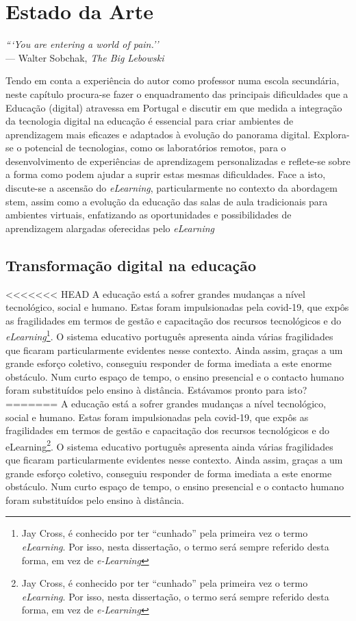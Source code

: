 \chapter{Estado da Arte}
\label{Capitulo2}

\begin{flushright}
\textit{```You are entering a world of pain.''} \\[0.5em]
--- Walter Sobchak, \textit{The Big Lebowski}
\end{flushright}
Tendo em conta a experiência do autor como professor numa escola secundária, neste capítulo procura-se fazer o enquadramento das principais dificuldades que a Educação (digital) atravessa em Portugal e discutir em que medida a integração da tecnologia digital na educação é essencial para criar ambientes de aprendizagem mais eficazes e adaptados à evolução do panorama digital. Explora-se o potencial de tecnologias, como os laboratórios remotos, para o desenvolvimento de experiências de aprendizagem personalizadas e reflete-se sobre a forma como podem ajudar a suprir estas mesmas dificuldades.
Face a isto, discute-se a ascensão do \textit{eLearning}, particularmente no contexto da abordagem \acrshort{stem}, assim como a evolução da educação das salas de aula tradicionais para ambientes virtuais, enfatizando as oportunidades e possibilidades de aprendizagem alargadas oferecidas pelo \textit{eLearning}

\section{Transformação digital na educação}
\label{sec:transformaçãodigital}
<<<<<<< HEAD
A educação está a sofrer grandes mudanças a nível tecnológico, social e humano. Estas foram impulsionadas pela \acrfull{covid-19}, que expôs as fragilidades em termos de gestão e capacitação dos recursos tecnológicos e do \textit{eLearning}\footnote{Jay Cross, é conhecido por ter ``cunhado'' pela primeira vez o termo \textit{eLearning}\cite{jaycross}. Por isso, nesta dissertação, o termo será sempre referido desta forma, em vez de \textit{e-Learning}}. O sistema educativo português apresenta ainda várias fragilidades que ficaram particularmente evidentes nesse contexto. Ainda assim, graças a um grande esforço coletivo, conseguiu responder de forma imediata a este enorme obstáculo. Num curto espaço de tempo, o ensino presencial e o contacto humano foram substituídos pelo ensino à distância. Estávamos pronto para isto?
=======
A educação está a sofrer grandes mudanças a nível tecnológico, social e humano. Estas foram impulsionadas pela \acrfull{covid-19}, que expôs as fragilidades em termos de gestão e capacitação dos recursos tecnológicos e do eLearning\footnote{Jay Cross, é conhecido por ter ``cunhado'' pela primeira vez o termo \textit{eLearning}\cite{jaycross}. Por isso, nesta dissertação, o termo será sempre referido desta forma, em vez de \textit{e-Learning}}. O sistema educativo português apresenta ainda várias fragilidades que ficaram particularmente evidentes nesse contexto. Ainda assim, graças a um grande esforço coletivo, conseguiu responder de forma imediata a este enorme obstáculo. Num curto espaço de tempo, o ensino presencial e o contacto humano foram substituídos pelo ensino à distância.

